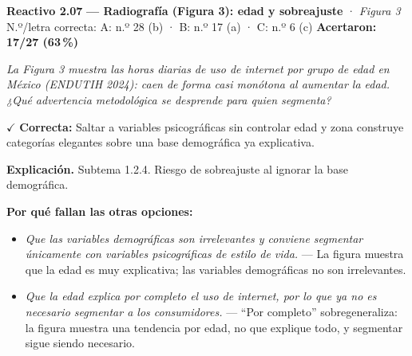 \documentclass[10pt,letterpaper]{article}
\begin{document}
\begin{minipage}{\textwidth}
{\color{guinda}\textbf{Reactivo 2.07}} \textbf{— Radiografía (Figura 3): edad y sobreajuste} · \textit{Figura 3}\\[-1pt]
{\scriptsize N.º/letra correcta: A: n.º 28 (b) · B: n.º 17 (a) · C: n.º 6 (c) \hfill \textbf{Acertaron: 17/27 (63\,\%)}}

\textit{La Figura 3 muestra las horas diarias de uso de internet por grupo de edad en México (ENDUTIH 2024): caen de forma casi monótona al aumentar la edad. ¿Qué advertencia metodológica se desprende para quien segmenta?}

\textcolor{verde}{$\checkmark$} \textbf{Correcta:} Saltar a variables psicográficas sin controlar edad y zona construye categorías elegantes sobre una base demográfica ya explicativa.

\textbf{Explicación.} Subtema 1.2.4. Riesgo de sobreajuste al ignorar la base demográfica.

\textbf{Por qué fallan las otras opciones:}
\begin{itemize}[itemsep=0pt,topsep=1pt,leftmargin=1.3em,parsep=0pt]
\item[\textcolor{rojo}{$\times$}] \textit{Que las variables demográficas son irrelevantes y conviene segmentar únicamente con variables psicográficas de estilo de vida.} --- La figura muestra que la edad es muy explicativa; las variables demográficas no son irrelevantes.
\item[\textcolor{rojo}{$\times$}] \textit{Que la edad explica por completo el uso de internet, por lo que ya no es necesario segmentar a los consumidores.} --- ``Por completo'' sobregeneraliza: la figura muestra una tendencia por edad, no que explique todo, y segmentar sigue siendo necesario.
\end{itemize}
\end{minipage}\par\vspace{5pt}{\color{gray!40}\hrule}\vspace{5pt}
\end{document}
